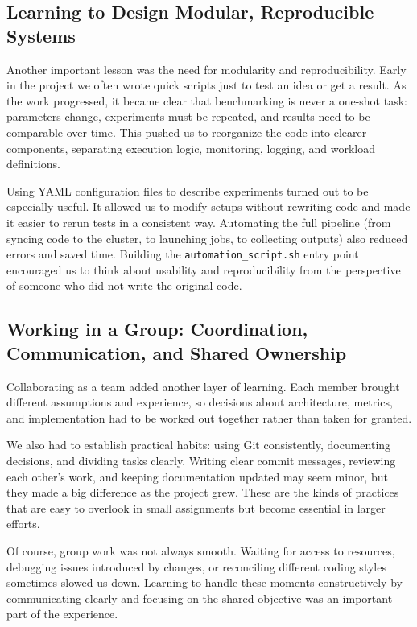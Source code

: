 \documentclass[11pt,a4paper]{article}
\begin{document}
\subsection{Learning to Design Modular, Reproducible Systems}

Another important lesson was the need for modularity and reproducibility. Early in the project we often wrote quick scripts just to test an idea or get a result. As the work progressed, it became clear that benchmarking is never a one-shot task: parameters change, experiments must be repeated, and results need to be comparable over time. This pushed us to reorganize the code into clearer components, separating execution logic, monitoring, logging, and workload definitions.

Using YAML configuration files to describe experiments turned out to be especially useful. It allowed us to modify setups without rewriting code and made it easier to rerun tests in a consistent way. Automating the full pipeline (from syncing code to the cluster, to launching jobs, to collecting outputs) also reduced errors and saved time. Building the \texttt{automation\_script.sh} entry point encouraged us to think about usability and reproducibility from the perspective of someone who did not write the original code.

\subsection{Working in a Group: Coordination, Communication, and Shared Ownership}

Collaborating as a team added another layer of learning. Each member brought different assumptions and experience, so decisions about architecture, metrics, and implementation had to be worked out together rather than taken for granted.

We also had to establish practical habits: using Git consistently, documenting decisions, and dividing tasks clearly. Writing clear commit messages, reviewing each other's work, and keeping documentation updated may seem minor, but they made a big difference as the project grew. These are the kinds of practices that are easy to overlook in small assignments but become essential in larger efforts.

Of course, group work was not always smooth. Waiting for access to resources, debugging issues introduced by changes, or reconciling different coding styles sometimes slowed us down. Learning to handle these moments constructively by communicating clearly and focusing on the shared objective was an important part of the experience.
\end{document}
